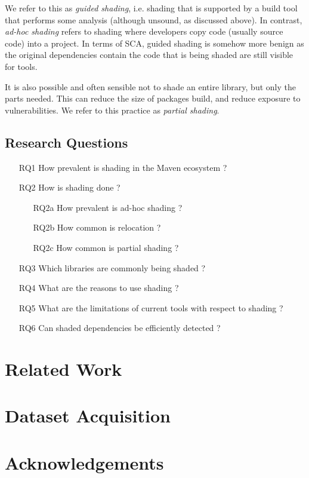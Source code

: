 \documentclass{article}
\begin{document}
 We refer to this as \textit{guided shading}, i.e. shading that is supported by a build tool that performs some analysis (although unsound, as discussed above). In contrast, \textit{ad-hoc shading} refers to shading where developers copy code (usually source code) into a project.  In terms of SCA, guided shading is somehow more benign as the original dependencies contain the code that is being shaded are still visible for tools.  
 
It is also possible and often sensible not to shade an entire library, but only the parts needed. This can reduce the size of packages build, and reduce exposure to vulnerabilities. We refer to this practice as \textit{partial shading}. 
 
 
 
 


\subsection{Research Questions}

\begin{enumerate}
	\item[RQ1]  How prevalent is shading in the Maven ecosystem ?  
	\item[RQ2] How is shading done ?
	\begin{enumerate}
		\item[RQ2a] How prevalent is ad-hoc shading ?
		\item[RQ2b] How common is relocation ?
		\item[RQ2c] How common is partial shading ?
	\end{enumerate}
	\item[RQ3] Which libraries are commonly being shaded ? 
	\item[RQ4] What are the reasons to use shading ?
	\item[RQ5] What are the limitations of current tools with respect to shading ?
	\item[RQ6] Can shaded dependencies be efficiently detected ? 
\end{enumerate}



\section{Related Work}



\section{Dataset Acquisition}



\section{Acknowledgements}



\end{document}
